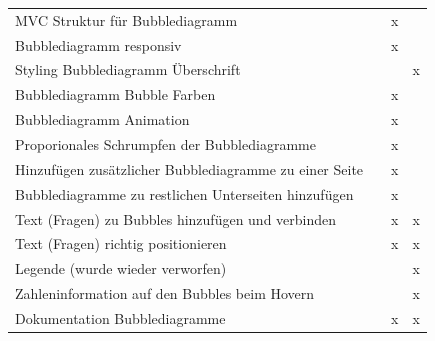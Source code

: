 \documentclass{mi-seminar}
\begin{document}
\begin{longtable}{p{5cm} | c | c | c}
MVC Struktur für Bubblediagramm & & x & \\
Bubblediagramm responsiv & & x & \\
Styling Bubblediagramm Überschrift & & & x \\
Bubblediagramm Bubble Farben & & x & \\
Bubblediagramm Animation & & x & \\
Proporionales Schrumpfen der Bubblediagramme & & x & \\
Hinzufügen zusätzlicher Bubblediagramme zu einer Seite & & x & \\
Bubblediagramme zu restlichen Unterseiten hinzufügen & & x & \\
Text (Fragen) zu Bubbles hinzufügen und verbinden & & x & x \\
Text (Fragen) richtig positionieren & & x & x \\
Legende (wurde wieder verworfen) & & & x \\
Zahleninformation auf den Bubbles beim Hovern & & & x\\
Dokumentation Bubblediagramme & & x & x\\



\end{longtable}
\end{document}
